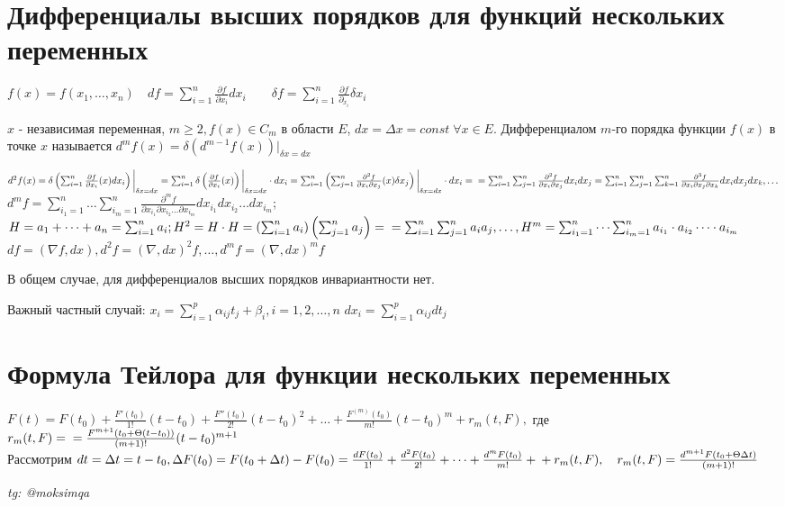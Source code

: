 \documentclass[../main.tex]{subfiles}
\begin{document}
\section{Дифференциалы высших порядков для функций нескольких переменных}
$f(x)= f(x_{1},\dots,x_{n})\quad df=\sum_{i =1}^{n}\frac{\partial{f}}{\partial{x_{i}}}dx_{i} \qquad \delta f = \sum_{i  =1}^{n  } \frac{\partial{f}}{\partial_{x_{i}}}\delta x_{i}$
\begin{definition}
    $x$ - независимая переменная, $m\geqslant 2 , f(x) \in C_{m}$ в области $E$, $dx = \Delta x = const \; \forall x\in E$. Дифференциалом $m$-го порядка функции $f(x)$ в точке $x$ называется $d^{m}f(x) = \delta \left( d^{m-1}f(x)\right)\bigg|_{\delta x = dx}$
\end{definition}
\noindent $d^{2}f(x) = \delta \left( \sum_{ i  =1}^{n} \frac{\partial{f}}{\partial{x_{i}}}(x)dx_{i}\right)\bigg|_{\delta x = dx} = \sum_{i   =1}^{n} \delta\left( \frac{\partial{f}}{\partial{x_{i}}}(x)\right)\bigg|_{\delta x = dx}\cdot dx_{i}= \sum_{i   =1}^{n  } \left( \sum_{j=1}^{n} \frac{\partial^{2}{f}}{\partial{x_{i}}\partial{x_{j}}}(x)\delta x_{j}\right)\bigg|_{\delta x = dx} \cdot dx_{i} =\\= \sum_{i   =1}^{n  } \sum_{j=1}^{n} \frac{\partial^{2}{f}}{\partial{x_{i}}\partial{x_{j}}}dx_{i}dx_{j} = \sum_{i   =1}^{n  }\sum_{j=1}^{n}\sum_{k=1}^{n} \frac{\partial^{3}{f}}{\partial{x_{i}}\partial{x_{j}}\partial{x_{k}}}dx_{i}dx_{j}dx_{k}, \dots$  \\ 
$d^{m}f = \sum_{i_{1}   =1}^{n  } \dots \sum_{i_{m}=1}^{n} \frac{\partial^{m}{f}}{\partial{x_{i_{1}}}\partial{x_{i_{2}}}\dots\partial{x_{i_{m}}}}dx_{i_{1}}dx_{i_{2}}\dots dx_{i_{m}}$; $H = a_{1}  + \dots +a_{n} = \sum_{ i   =1}^{n  } a_{i}; H^{2} = H\cdot H = \left(\sum_{i   =1}^{n} a_{i}\right)\left( \sum_{j=1}^{n} a_{j}\right) =\\= \sum_{i   =1}^{n  } \sum_{j=1}^{n} a_{i}a_{j}, \dots , H^{m} = \sum_{i_{1}   =1}^{n  } \dots \sum_{i_{m}=1}^{n} a_{i_{1}}\cdot  a_{i_{2}}\dots \cdot a_{i_{m}}$\\   
$df = (\nabla f ,dx), d^{2}f = (\nabla , dx)^{2} f,\dots, d^{m}f = (\nabla,dx)^{m}f$

В общем случае, для дифференциалов высших порядков инвариантности нет. 

Важный частный случай: $ x_{i} = \sum_{i    =1}^{p} \alpha_{ij}t_{j} + \beta_{i}, i =1,2,\dots,n$ 
\qquad $dx_{i} = \sum_{i =1}^{p  } \alpha_{ij}dt_{j}$ 
\section{Формула Тейлора для функции нескольких переменных}
\noindent$F(t) = F(t_{0})+ \frac{F'(t_{0})}{1!}(t-t_{0})+ \frac{F''(t_{0})}{2!}(t-t_{0})^{2}+\dots + \frac{F^{(m)}(t_{0})}{m!}(t-t_{0})^{m} + r_{m}(t,F),$ где $r_{m}(t,F) =  \\ = \frac{F^{m+1}(t_{0}+\Theta(t-t_{0}))}{(m+1)!}(t-t_{0})^{m+1}$\\ 
Рассмотрим $dt = \Delta t  = t -t_{0}, \Delta F(t_{0}) = F(t_{0}+\Delta t) - F(t_{0}) = \frac{dF(t_{0})}{1!} + \frac{d^{2}F(t_{0})}{2!} + \dots + \frac{d^{m}F(t_{0})}{m!} +\\+ r_{m}(t,F), \quad r_{m}(t,F) = \frac{d^{m+1}F(t_{0}+\Theta \Delta t)}{(m+1)!}$


\vspace{1cm}
\begin{flushright}
    \textit{tg: @moksimqa}
\end{flushright}
\end{document}
